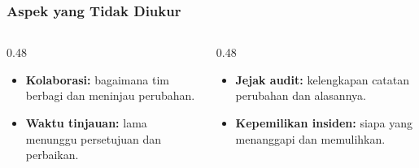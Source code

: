 {
\usebackgroundtemplate{\backgroundcontent}
\begin{frame}
    \frametitle{Aspek yang Tidak Diukur}
    \begin{columns}[T]
        \begin{column}{0.48\textwidth}
            \scriptsize
            \begin{itemize}\setlength{\itemsep}{5pt}
                \item \textbf{Kolaborasi:} bagaimana tim berbagi dan meninjau perubahan.
                \item \textbf{Waktu tinjauan:} lama menunggu persetujuan dan perbaikan.
            \end{itemize}
        \end{column}
        \begin{column}{0.48\textwidth}
            \scriptsize
            \begin{itemize}\setlength{\itemsep}{5pt}
                \item \textbf{Jejak audit:} kelengkapan catatan perubahan dan alasannya.
                \item \textbf{Kepemilikan insiden:} siapa yang menanggapi dan memulihkan.
            \end{itemize}
        \end{column}
    \end{columns}
    \vspace{0.12cm}
    \vspace{0.06cm}
\end{frame}
}

